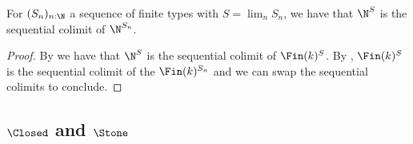 \begin{corollary}\label{scott-continuity}
  For $(S_n)_{n:\N}$ a sequence of finite types with $S=\lim_nS_n$, we have that $\N^S$ is the sequential colimit of $\N^{S_n}$. 
\end{corollary}
\begin{proof}
  By  we have that $\N^S$ is the sequential colimit of $\Fin(k)^S$. 
  By , $\Fin(k)^S$ is the sequential colimit of the $\Fin(k)^{S_n}$ and we can swap the sequential colimits to conclude.
  \end{proof} 



\subsection{$\Closed$ and $\Stone$}

